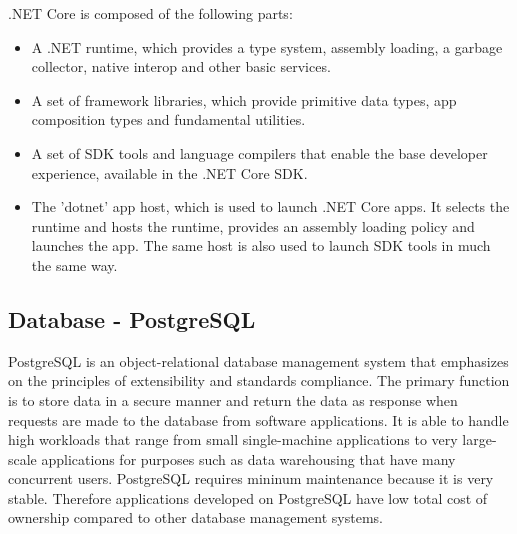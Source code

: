 \documentclass[../thesis.tex]{subfiles}
\begin{document}
.NET Core is composed of the following parts:
\begin{itemize}
\item A .NET runtime, which provides a type system, assembly loading, a garbage collector, native interop and other basic services.
\newline
    
\item A set of framework libraries, which provide primitive data types, app composition types and fundamental utilities.
\newline
    
\item A set of SDK tools and language compilers that enable the base developer experience, available in the .NET Core SDK.
\newline
    
\item The 'dotnet' app host, which is used to launch .NET Core apps. It selects the runtime and hosts the runtime, provides an assembly loading policy and launches the app. The same host is also used to launch SDK tools in much the same way.
\end{itemize}

\subsection{Database - PostgreSQL}
PostgreSQL is an object-relational database management system that emphasizes on the principles of extensibility and standards compliance. The primary function is to store data in a secure manner and return the data as response when requests are made to the database from software applications. It is able to handle high workloads that range from small single-machine applications to very large-scale applications for purposes such as data warehousing that have many concurrent users. 
PostgreSQL requires mininum maintenance because it is very stable. Therefore applications developed on PostgreSQL have low total cost of ownership compared to other database management systems.
\linebreak
\end{document}
